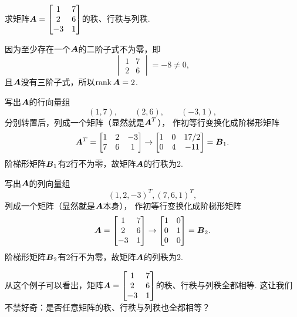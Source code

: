 \begin{example}
求矩阵\(\boldsymbol{A} = \begin{bmatrix} 1 & 7 \\ 2 & 6 \\ -3 & 1 \end{bmatrix}\)的秩、行秩与列秩.
\begin{solution}
因为至少存在一个\(\boldsymbol{A}\)的二阶子式不为零，即\begin{equation*}
	\begin{vmatrix} 1 & 7 \\ 2 & 6 \end{vmatrix} = -8 \neq 0,
\end{equation*}
且\(\boldsymbol{A}\)没有三阶子式，所以\(\rank\boldsymbol{A} = 2\).

写出\(\boldsymbol{A}\)的行向量组\begin{equation*}
	(1,7), \qquad
	(2,6), \qquad
	(-3,1),
\end{equation*}
分别转置后，列成一个矩阵（显然就是\(\boldsymbol{A}^T\)），
作初等行变换化成阶梯形矩阵\begin{equation*}
	\boldsymbol{A}^T = \begin{bmatrix}
		1 & 2 & -3 \\
		7 & 6 & 1
	\end{bmatrix} \to \begin{bmatrix}
		1 & 0 & 17/2 \\
		0 & 4 & -11
	\end{bmatrix} = \boldsymbol{B}_1.
\end{equation*}阶梯形矩阵\(\boldsymbol{B}_1\)有2行不为零，故矩阵\(\boldsymbol{A}\)的行秩为2.

写出\(\boldsymbol{A}\)的列向量组\begin{equation*}
	(1,2,-3)^T,
	(7,6,1)^T,
\end{equation*}列成一个矩阵（显然就是\(\boldsymbol{A}\)本身），
作初等行变换化成阶梯形矩阵\begin{equation*}
	\boldsymbol{A} = \begin{bmatrix} 1 & 7 \\ 2 & 6 \\ -3 & 1 \end{bmatrix}
	\to \begin{bmatrix} 1 & 0 \\ 0 & 1 \\ 0 & 0 \end{bmatrix} = \boldsymbol{B}_2.
\end{equation*}
阶梯形矩阵\(\boldsymbol{B}_2\)有2行不为零，故矩阵\(\boldsymbol{A}\)的列秩为2.
\end{solution}
\end{example}
\begin{remark}
从这个例子可以看出，矩阵\(\boldsymbol{A} = \begin{bmatrix} 1 & 7 \\ 2 & 6 \\ -3 & 1 \end{bmatrix}\)的秩、行秩与列秩全都相等.
这让我们不禁好奇：是否任意矩阵的秩、行秩与列秩也全都相等？
\end{remark}

